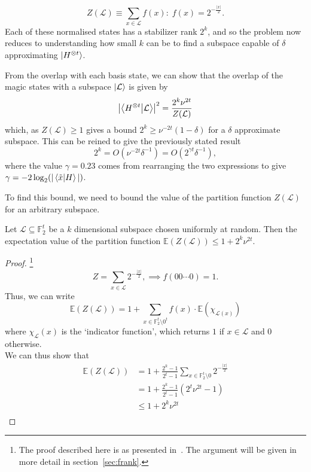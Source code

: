 \documentclass{standalone}
\begin{document}
\begin{equation}
  \label{eq:ZH}
  Z(\mathcal{L})\equiv\sum_{x\in\mathcal{L}} f(x) : \; f(x) = 2^{-\frac{\vert x \vert}{2}}.
\end{equation}
Each of these normalised states has a stabilizer rank $2^{k}$, and so the problem now reduces to understanding how small $k$ can be to find a subspace capable of $\delta$ approximating $\ket{H^{\otimes t}}$.
\par
From the overlap with each basis state, we can show that the overlap of the magic states with a subspace $\ket{\mathcal{L}}$ is given by
\begin{equation}
    \label{eq:HLoverlap}
    \left|\braket{H^{\otimes t}}{\mathcal{L}}\right|^{2}=\frac{2^{k}\nu^{2t}}{Z(\mathcal{L})}
\end{equation}
which, as $Z(\mathcal{L})\geq 1$ gives a bound $2^{k}\geq \nu^{-2t}(1-\delta)$ for a $\delta$ approximate subspace. This can be reined to give the previously stated result
\begin{equation}
2^{k}=O(\nu^{-2t}\delta^{-1})=O(2^{\gamma t}\delta^{-1}),
\end{equation} 
where the value $\gamma=0.23$ comes from rearranging the two expressions to give $\gamma=-2\log_{2}(\vert\braket{\tilde{x}}{H}\vert)$.
\par
To find this bound, we need to bound the value of the partition function $Z(\mathcal{L})$ for an arbitrary subspace.
\par
\begin{lem}\label{thm:expectation}
    Let $\mathcal{L}\subseteq\mathbb{F}_{2}^{t}$ be a $k$ dimensional subspace chosen uniformly at random. Then the expectation value of the partition function $\mathbb{E}(Z(\mathcal{L}))\leq 1+2^{k}\nu^{2t}$.
\end{lem}
\begin{proof}\footnote{The proof described here is as presented in~\cite{Bravyi2016b}. The argument will be given in more detail in section~\ref{sec:frank}.}
    \[Z = \sum_{x\in\mathcal{L}}2^{-\frac{\vert x\vert}{2}}, \implies f(00\cdots 0)=1.\] 
    Thus, we can write
    \[\mathbb{E}(Z(\mathcal{L})) = 1+\sum_{x\in\mathbb{F}_{2}^{t}\setminus 0^{t}}f(x)\cdot \mathbb{E}\left(\chi_{\mathcal{L}(x)}\right)\]
    where $\chi_{\mathcal{L}}(x)$ is the `indicator function', which returns $1$ if $x\in\mathcal{L}$ and $0$ otherwise. \\
    We can thus show that
    \begin{align*}
        \mathbb{E}\left(Z(\mathcal{L})\right) 
        &= 1+\frac{2^k-1}{2^t-1}\sum_{x\in\mathbb{F}_{2}^{t}\setminus 0}2^{-\frac{\vert x\vert}{2}}\\
        &=1+\frac{2^k-1}{2^t-1}\left(2^t\nu^{2t}-1\right)\\
        &\leq 1+2^{k}\nu^{2t}\\
    \end{align*}
\end{proof}
\end{document}
